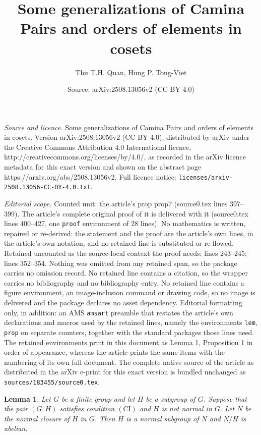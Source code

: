 \documentclass[10pt,a4paper]{amsart}
\title{Some generalizations of Camina Pairs and orders of elements in cosets}
\author{Thu T.H. Quan, Hung P. Tong-Viet}
\date{Source: arXiv:2508.13056v2 (CC BY 4.0)}
\newtheorem{lem}{Lemma}
\newcommand{\CI}{\mathrm{(CI)}}
\begin{document}
\maketitle

\noindent\emph{Source and licence.} Some generalizations of Camina Pairs and orders of elements in cosets. Version arXiv:2508.13056v2 (CC BY 4.0), distributed by arXiv under the Creative Commons Attribution 4.0 International licence, http://creativecommons.org/licenses/by/4.0/, as recorded in the arXiv licence metadata for this exact version and shown on the abstract page https://arxiv.org/abs/2508.13056v2. Full licence notice: \texttt{licenses/arxiv-2508.13056-CC-BY-4.0.txt}.\par\smallskip

\noindent\textit{Editorial scope.} Counted unit: the article's prop prop7 (source0.tex lines 397--399). The article's complete original proof of it is delivered with it (source0.tex lines 400--427, one \texttt{proof} environment of 28 lines). No mathematics is written, repaired or re-derived: the statement and the proof are the article's own lines, in the article's own notation, and no retained line is substituted or re-flowed.  Retained uncounted as the source-local context the proof needs: lines 243--245; lines 352--354.  Nothing was omitted from any retained span, so the package carries no omission record.  No retained line contains a citation, so the wrapper carries no bibliography and no bibliography entry.  No retained line contains a figure environment, an image-inclusion command or drawing code, so no image is delivered and the package declares no asset dependency.  Editorial formatting only, in addition: an AMS \texttt{amsart} preamble that restates the article's own declarations and macros used by the retained lines, namely the environments \texttt{lem}, \texttt{prop} on separate counters, together with the standard packages those lines need.  The retained environments print in this document as Lemma 1, Proposition 1 in order of appearance, whereas the article prints the same items with the numbering of its own full document.  The complete native source of the article as distributed in the arXiv e-print for this exact version is bundled unchanged as \texttt{sources/183455/source0.tex}.
\begin{lem} \label{Hnormal}
Let $G$ be a finite group and let $H$ be a subgroup of $G$.	Suppose that the pair $(G,H)$ satisfies condition $\CI$ and $H$ is not normal in $G$. Let $N$ be the normal closure of $H$ in $G$. Then  $H$ is a normal subgroup of $N$ and $N/H$ is abelian. 
\end{lem}
\end{document}
